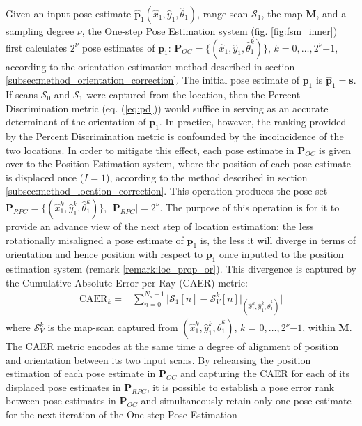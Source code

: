 Given an input pose estimate $\hat{\bm{p}}_1(\hat{x}_1, \hat{y}_1,
\hat{\theta}_1)$, range scan $\mathcal{S}_1$, the map $\bm{M}$, and a sampling
degree $\nu$, the One-step Pose Estimation system (fig. \ref{fig:fsm_inner})
first calculates $2^\nu$ pose estimates of $\bm{p}_1$: $\bm{P}_{OC} =
\{(\hat{x}_1, \hat{y}_1, \hat{\theta}_1^k)\}$, $k = 0,\dots,2^\nu$$-$$1$,
according to the orientation estimation method described in section
\ref{subsec:method_orientation_correction}. The initial pose estimate of
$\bm{p}_1$ is $\hat{\bm{p}}_1 = \bm{s}$.
If scans $\mathcal{S}_0$ and
$\mathcal{S}_1$ were captured from the location, then the Percent
Discrimination metric (eq. (\ref{eq:pd})) would suffice in serving as an
accurate determinant of the orientation of $\bm{p}_1$. In practice, however,
the ranking provided by the Percent Discrimination metric is confounded by the
incoincidence of the two locations. In order to mitigate this effect, each pose
estimate in $\bm{P}_{OC}$ is given over to the Position Estimation system,
where the position of each pose estimate is displaced once ($I=1$), according
to the method described in section \ref{subsec:method_location_correction}.
This operation produces the pose set
$\bm{P}_{RPC} = \{(\hat{x}_1^k, \hat{y}_1^k, \hat{\theta}_1^k)\}$,
$|\bm{P}_{RPC}| = 2^\nu$. The purpose of this operation is for it to provide an
advance view of the next step of location estimation: the less rotationally
misaligned a pose estimate of $\bm{p}_1$ is, the less it will diverge in terms
of orientation and hence position with respect to $\bm{p}_1$ once inputted to
the position estimation system (remark \ref{remark:loc_prop_or}). This
divergence is captured by the Cumulative Absolute Error per Ray (CAER) metric:
\begin{align}
  \text{CAER}_k = & \sum\limits_{n=0}^{N_s-1} \Bigg| \mathcal{S}_1[n] - \mathcal{S}_V^k[n]\Big|_{(\hat{x}_1^k, \hat{y}_1^k, \hat{\theta}_1^k)} \Bigg|
  \label{eq:caer}
\end{align}
where $\mathcal{S}_V^k$ is the map-scan captured from
$(\hat{x}_1^k, \hat{y}_1^k, \hat{\theta}_1^k)$, $k$ = $0,\dots,2^\nu$$-$$1$, within $\bm{M}$. The CAER metric
encodes at the same time a degree of alignment of position and orientation
between its two input scans. By rehearsing the position estimation of each pose
estimate in $\bm{P}_{OC}$ and capturing the CAER for each of its displaced pose
estimates in $\bm{P}_{RPC}$, it is possible to establish a pose error rank
between pose estimates in $\bm{P}_{OC}$ and simultaneously retain only one pose
estimate for the next iteration of the One-step Pose Estimation
